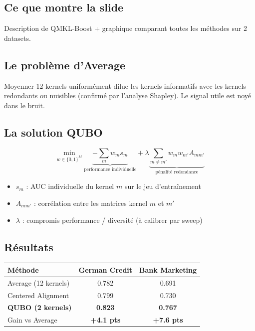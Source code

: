 \documentclass[12pt, a4paper]{article}
\begin{document}
\subsection*{Ce que montre la slide}

Description de QMKL-Boost + graphique comparant toutes les méthodes sur 2 datasets.

\subsection*{Le problème d'Average}

Moyenner 12 kernels uniformément dilue les kernels informatifs avec les kernels
redondants ou nuisibles (confirmé par l'analyse Shapley).
Le signal utile est noyé dans le bruit.

\subsection*{La solution QUBO}

$$\min_{w \in \{0,1\}^M}
  \underbrace{-\sum_m w_m s_m}_{\text{performance individuelle}}
  + \lambda \underbrace{\sum_{m \neq m'} w_m w_{m'} A_{mm'}}_{\text{pénalité redondance}}$$

\begin{itemize}
  \item $s_m$ : AUC individuelle du kernel $m$ sur le jeu d'entraînement
  \item $A_{mm'}$ : corrélation entre les matrices kernel $m$ et $m'$
  \item $\lambda$ : compromis performance / diversité (à calibrer par sweep)
\end{itemize}

\subsection*{Résultats}

\begin{center}
\begin{tabular}{lcc}
  \toprule
  \textbf{Méthode} & \textbf{German Credit} & \textbf{Bank Marketing} \\
  \midrule
  Average (12 kernels)     & 0.782 & 0.691 \\
  Centered Alignment        & 0.799 & 0.730 \\
  \textbf{QUBO (2 kernels)} & \textbf{0.823} & \textbf{0.767} \\
  \midrule
  Gain vs Average           & \textbf{+4.1 pts} & \textbf{+7.6 pts} \\
  \bottomrule
\end{tabular}
\end{center}
\end{document}
